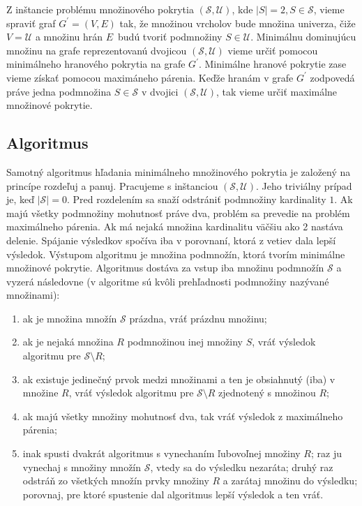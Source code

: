 Z inštancie problému množinového pokrytia $(\mathcal{S}, \mathcal{U})$, kde 
$|S| = 2, S \in \mathcal{S}$, vieme spraviť graf $G^\prime = (V, E)$ tak, 
že množinou vrcholov bude množina univerza, čiže $V = \mathcal{U}$ a množinu 
hrán $E$ budú tvoriť podmnožiny $S \in \mathcal{U}$. Minimálnu dominujúcu 
množinu na grafe reprezentovanú dvojicou $(\mathcal{S}, \mathcal{U})$ vieme 
určiť pomocou minimálneho hranového pokrytia na grafe $G^\prime$. 
Minimálne hranové pokrytie zase vieme získať pomocou maximáneho párenia. 
Keďže hranám v grafe $G^\prime$ zodpovedá práve jedna podmnožina 
$S \in \mathcal{S}$ v dvojici $(\mathcal{S}, \mathcal{U})$, tak vieme určiť 
maximálne množinové pokrytie.

\subsection{Algoritmus}

Samotný algoritmus hľadania minimálneho množinového pokrytia je založený na 
princípe rozdeľuj a panuj. Pracujeme s inštanciou $(\mathcal{S}, \mathcal{U})$. 
Jeho triviálny prípad je, keď $|\mathcal{S}| = 0$. Pred rozdelením sa snaží 
odstrániť podmnožiny kardinality $1$.  Ak majú všetky podmnožiny mohutnosť 
práve dva, problém sa prevedie na problém maximálneho párenia. Ak má nejaká 
množina kardinalitu väčšiu ako 2 nastáva delenie. Spájanie výsledkov spočíva 
iba v porovnaní, ktorá z vetiev dala lepší výsledok. Výstupom algoritmu je 
množina podmnožín, ktorá tvorím minimálne množinové pokrytie. Algoritmus 
dostáva za vstup iba množinu podmnožín $\mathcal{S}$ a vyzerá následovne 
(v algoritme sú kvôli prehľadnosti podmnožiny nazývané množinami):

\begin{enumerate}
	\item ak je množina množín $\mathcal{S}$ prázdna, vráť prázdnu množinu;
	\item ak je nejaká množina $R$ podmnožinou inej množiny $S$, vráť výsledok 
		algoritmu pre $\mathcal{S} \setminus R$;
	\item ak existuje jedinečný prvok medzi množinami a ten je obsiahnutý (iba) 
		v množine $R$, vráť výsledok algoritmu pre $\mathcal{S} \setminus R$ 
		zjednotený s množinou $R$;
	\item ak majú všetky množiny mohutnosť dva, tak vráť výsledok z maximálneho 
		párenia;
	\item inak spusti dvakrát algoritmus s vynechaním ľubovoľnej množiny $R$; 
		raz ju vynechaj s množiny množín $\mathcal{S}$, vtedy sa do výsledku 
		nezaráta; druhý raz odstráň zo všetkých množín prvky množiny $R$ a 
		zarátaj množinu do výsledku; porovnaj, pre ktoré spustenie dal 
		algoritmus lepší výsledok a ten vráť.
\end{enumerate}

